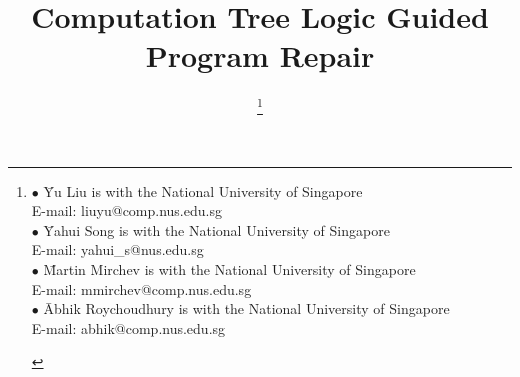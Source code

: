 \documentclass[10pt,journal,compsoc]{IEEEtran}
\begin{document}
\title{Computation Tree Logic Guided Program Repair}

\author{
    \thanks{
        \begin{tabbing}
        $\bullet$ \= Yu Liu is with the National University of Singapore \\ 
        \> E-mail: liuyu@comp.nus.edu.sg \vspace{6pt} \\

        $\bullet$ \= Yahui Song is with the National University of Singapore \\ 
        \> E-mail: yahui\_s@nus.edu.sg \vspace{6pt} \\

        $\bullet$ \= Martin Mirchev is with the National University of Singapore \\ 
        \> E-mail: mmirchev@comp.nus.edu.sg \vspace{6pt} \\

        $\bullet$ \= Abhik Roychoudhury is with the National University of Singapore \\ 
        \> E-mail: abhik@comp.nus.edu.sg \vspace{6pt} \\

        \end{tabbing}
    }
}
\end{document}
